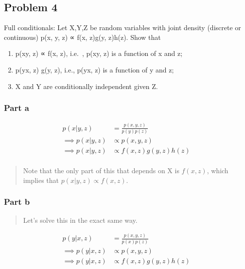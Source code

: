 \documentclass[
  letterpaper,
  DIV=11,
  numbers=noendperiod]{scrartcl}
\providecommand{\tightlist}{%
  \setlength{\itemsep}{0pt}\setlength{\parskip}{0pt}}\usepackage{longtable,booktabs,array}
\begin{document}
\subsection{Problem 4}\label{problem-4}

Full conditionals: Let X,Y,Z be random variables with joint density
(discrete or continuous) p(x, y, z) ∝ f(x, z)g(y, z)h(z). Show that

\begin{enumerate}
\def\labelenumi{(\alph{enumi})}
\tightlist
\item
  p(x\textbar y, z) ∝ f(x, z), i.e.~, p(x\textbar y, z) is a function of
  x and z;
\item
  p(y\textbar x, z) \propto g(y, z), i.e., p(y\textbar x, z) is a
  function of y and z;
\item
  X and Y are conditionally independent given Z.
\end{enumerate}

\subsubsection{Part a}\label{part-a-1}

\begin{align*}
p(x|y, z) &= \frac{p(x, y, z)}{p(y)p(z)}\\
\implies p(x|y, z) &\propto p(x, y, z)\\
\implies p(x|y, z) &\propto f(x, z)g(y, z)h(z)\\
\end{align*}

\begin{quote}
Note that the only part of this that depends on X is \(f(x, z)\), which
implies that \(p(x|y, z) \propto f(x, z)\).
\end{quote}

\subsubsection{Part b}\label{part-b-1}

\begin{quote}
Let's solve this in the exact same way.
\end{quote}

\begin{align*}
p(y|x, z) &= \frac{p(x, y, z)}{p(x)p(z)}\\
\implies p(y|x, z) &\propto p(x, y, z)\\
\implies p(y|x, z) &\propto f(x, z)g(y, z)h(z)\\
\end{align*}
\end{document}
